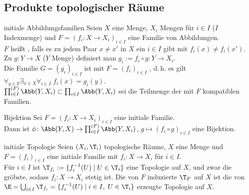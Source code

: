 \subsection{%
    Produkte topologischer Räume%
}

\begin{Def}{initiale Abbildungsfamilien}
    Seien $X$ eine Menge, $X_i$ Mengen für $i \in I$ ($I$ Indexmenge)
    und $F = (f_i\colon X \rightarrow X_i)_{i \in I}$ eine Familie von
    Abbildungen. \\
    $F$ heißt , falls es
    zu jedem Paar $x \not= x'$ in $X$ ein $i \in I$ gibt mit
    $f_i(x) \not= f_i(x')$. \\
    Zu $g\colon Y \rightarrow X$ ($Y$ Menge) definiert man
    $g_i := f_i \circ g\colon Y \rightarrow X_i$. \\
    Die Familie $G = (g_i)_{i \in I}$ ist mit $F = (f_i)_{i \in I}$
    , d.\,h. es gilt
    $\forall_{y \in Y} \exists_{x \in X} \forall_{i \in I}\;
    f_i(x) = g_i(y)$. \\
    $\prod_{i \in I}^{(F)} \Abb(Y, X_i) \subset \prod_{i \in I} \Abb(Y, X_i)$
    sei die Teilmenge der mit $F$ kompatiblen Familien.
\end{Def}

\begin{Satz}{Bijektion}
    Sei $F = (f_i\colon X \rightarrow X_i)_{i \in I}$ eine initiale Familie. \\
    Dann ist
    $\phi\colon \Abb(Y, X) \rightarrow \prod_{i \in I}^{(F)} \Abb(Y, X_i)$,
    $g \mapsto (f_i \circ g)_{i \in I}$ eine Bijektion.
\end{Satz}

\linie

\begin{Def}{initiale Topologie}
    Seien $(X_i, \T_i)$ topologische Räume, $X$ eine Menge und
    $F = (f_i)_{i \in I}$ eine initiale Familie mit
    $f_i\colon X \rightarrow X_i$ für $i \in I$. \\
    Für $i \in I$ ist $\T_{f_i} := \{f_i^{-1}(U) \;|\; U \in \T_i\}$ eine
    Topologie auf $X$, und zwar die gröbste, sodass
    $f_i\colon X \rightarrow X_i$ stetig ist.
    Die von $F$ induzierte  $\T_F$ auf $X$ ist
    die von \\
    $\E = \bigcup_{i \in I} \T_{f_i} =
    \{f_i^{-1}(U) \;|\; i \in I,\; U \in \T_i\}$ erzeugte Topologie auf $X$.
\end{Def}

